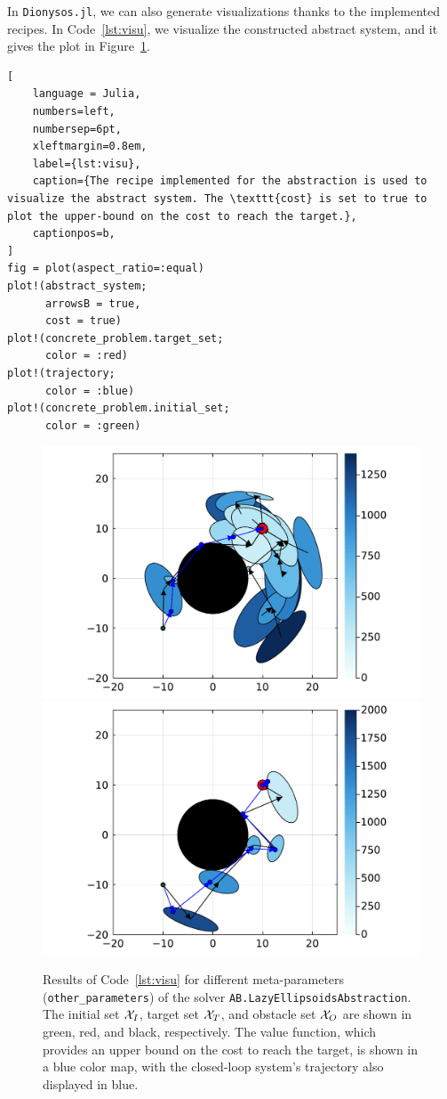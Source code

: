 \documentclass{juliacon}
\begin{document}
In \texttt{Dionysos.jl}, we can also generate visualizations thanks to the implemented recipes. In Code~\ref{lst:visu}, we visualize the constructed abstract system, and it gives the plot in Figure~\ref{fig:ex_plot}.
\begin{lstlisting}[
    language = Julia, 
    numbers=left, 
    numbersep=6pt, 
    xleftmargin=0.8em,
    label={lst:visu}, 
    caption={The recipe implemented for the abstraction is used to visualize the abstract system. The \texttt{cost} is set to true to plot the upper-bound on the cost to reach the target.},
    captionpos=b,
]
fig = plot(aspect_ratio=:equal)
plot!(abstract_system; 
      arrowsB = true, 
      cost = true)
plot!(concrete_problem.target_set; 
      color = :red)
plot!(trajectory; 
      color = :blue)
plot!(concrete_problem.initial_set; 
      color = :green)
\end{lstlisting}
\color{black}

\begin{figure}
    \centering
    \includegraphics[width=0.8\linewidth]{Figures/Example/abs_1.pdf}
    \includegraphics[width=0.8\linewidth]{Figures/Example/abs_2.pdf}
    \caption{
    \color{red} Results of Code~\ref{lst:visu} for different meta-parameters (\texttt{other\_parameters}) of the solver \texttt{AB.LazyEllipsoidsAbstraction}. 
    The initial set $\mathcal{X}_I$, target set $\mathcal{X}_T$, and obstacle set $\mathcal{X}_O$ are shown in green, red, and black, respectively. The value function, which provides an upper bound on the cost to reach the target, is shown in a blue color map, with the closed-loop system's trajectory also displayed in blue. \color{black}}
    \label{fig:ex_plot}
\end{figure}
\end{document}
